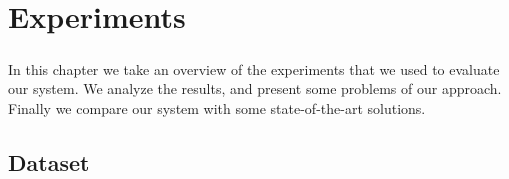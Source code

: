 
\chapter{Experiments}
\paragraph{}
In this chapter we take an overview of the experiments that we used to evaluate our system. We analyze the results, and present some problems of our approach. Finally we compare our system with some state-of-the-art solutions.


\section{Dataset}